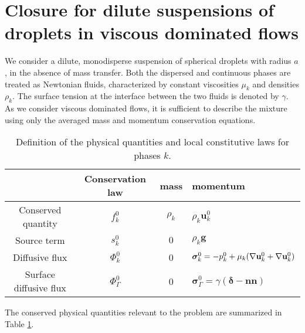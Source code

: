 \section{Closure for dilute suspensions of droplets in viscous dominated flows}




We consider a dilute, monodisperse suspension of spherical droplets with radius \( a \), in the absence of mass transfer. 
Both the dispersed and continuous phases are treated as Newtonian fluids, characterized by constant viscosities \( \mu_k \) and densities \( \rho_k \). 
The surface tension at the interface between the two fluids is denoted by \( \gamma \). 
As we consider viscous dominated flows, it is sufficient to describe the mixture using only the averaged mass and momentum conservation equations.
\begin{table}
    \centering
    \begin{tabular}{|c|ccl|}\hline
    & Conservation law & mass & momentum \\ \hline
    Conserved quantity & $f_k^0$  & $\rho_k$ & $\rho_k \textbf{u}_k^0$ \\
    Source term & $s_k^0$  & $0$ & $\rho_k \textbf{g}$ \\
    Diffusive flux & $\Phi_k^0$ & 0 & $\bm\sigma_k^0 = -p_k^0 + \mu_k (\mathbf{\nabla} \textbf{u}_k^0 + \mathbf{\nabla} \textbf{u}_k^0)$ \\
    Surface diffusive flux & $\Phi_\Gamma^0$ & 0 & $\bm\sigma_\Gamma^0 = \gamma (\bm\delta - \textbf{nn})$ \\\hline
    \end{tabular}

    \caption{Definition of the physical quantities and local constitutive laws for phases $k$.}
    \label{tab:qte_Newtonian}
\end{table}
The conserved physical quantities  relevant to the problem are summarized in Table \ref{tab:qte_Newtonian}.


